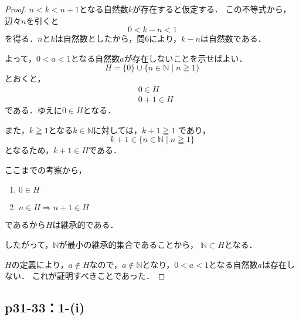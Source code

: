 \documentclass[uplatex,dvipdfmx,a4paper,10pt,fleqn]{jsarticle}
\begin{document}
\begin{tleftbar}
	\begin{proof}
		$n < k < n+1$となる自然数$k$が存在すると仮定する．
        この不等式から，辺々$n$を引くと
		\[
        0 < k - n < 1 
        \]
		を得る．$n$と$k$は自然数としたから，問6により，$k-n$は自然数である．
        
        よって，$0<a<1$となる自然数$a$が存在しないことを示せばよい．
		\[
            H=\{0\} \cup \{n \in \mathbb{N} \mid n \geqq 1 \}
        \]
		とおくと，
		\begin{align*}
			&0 \in H \\
			&0+1 \in H
		\end{align*}
		である．ゆえに$ 0 \in H$となる．

		また，$k \geqq 1$となる$k \in \mathbb{N}$に対しては，$k +1 \geqq 1$
        であり，
        \[
        k+1 \in \{n \in \mathbb{N} \mid n \geqq 1 \} 
        \]
        となるため，$k+1 \in H$である．
        
        ここまでの考察から，
        \begin{enumerate}
            \item $0 \in H$
            \item $n \in H \Longrightarrow n+1 \in H$
        \end{enumerate}
         であるから$H$は継承的である．
         
         したがって，$\mathbb{N}$が最小の継承的集合であることから，
         $\mathbb{N} \subset H$となる．
        
		$H$の定義により，$a \notin H$なので，$a \notin \mathbb{N}$となり，$0<a<1$となる自然数$a$は存在しない．
        これが証明すべきことであった．
	\end{proof}
\end{tleftbar}

\newpage 

\subsection*{p31-33：1-(i)}
\end{document}
